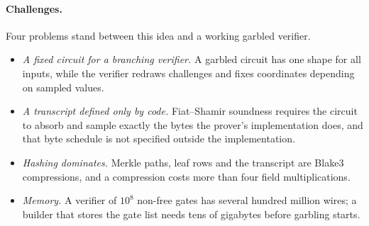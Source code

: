 \documentclass[11pt]{article}
\begin{document}
\paragraph{Challenges.} Four problems stand between this idea and a working
garbled verifier.
\begin{itemize}
  \item[C1] \emph{A fixed circuit for a branching verifier.} A garbled circuit has
    one shape for all inputs, while the verifier redraws challenges and fixes
    coordinates depending on sampled values.
  \item[C2] \emph{A transcript defined only by code.} Fiat--Shamir soundness
    requires the circuit to absorb and sample exactly the bytes the prover's
    implementation does, and that byte schedule is not specified outside the
    implementation.
  \item[C3] \emph{Hashing dominates.} Merkle paths, leaf rows and the transcript
    are Blake3 compressions, and a compression costs more than four field
    multiplications.
  \item[C4] \emph{Memory.} A verifier of $10^8$ non-free gates has several
    hundred million wires; a builder that stores the gate list needs tens of
    gigabytes before garbling starts.
\end{itemize}
\end{document}
